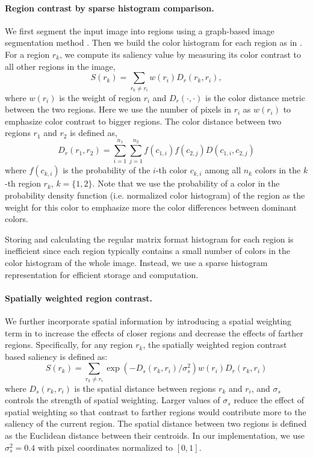 \documentclass[final]{cvpr}
\newcommand{\vnudge}{\vspace*{-.1in}}
\newcommand{\mypara}[1]{\paragraph{#1.}}
\begin{document}
\vnudge
\mypara{Region contrast by sparse histogram comparison}
We first segment the input image into regions using a graph-based image segmentation
method \cite{04ijcv/felzenszwalb_efficient}.
%
Then we build the color histogram for each region as in .
%
For a region $r_k$, we compute its saliency value by measuring its color contrast to all other
regions in the image,
\begin{equation}\label{equ:regContrastSaliency}
    S(r_k) = \sum_{r_k \neq r_i} w(r_i)  D_r(r_k, r_i),
\end{equation}
where $w(r_i)$ is the weight of region $r_i$ and $D_r(\cdot, \cdot)$ is the color distance metric
between the two regions.
%
Here we use the number of pixels in $r_i$ as $w(r_i)$ to emphasize color contrast to bigger regions.
%
The color distance between two regions $r_1$ and $r_2$ is defined as,
\begin{equation}\label{equ:regContrast}
    D_r(r_1, r_2) = \sum_{i=1}^{n_1} \sum_{j=1}^{n_2} f(c_{1,i}) f(c_{2,j}) D(c_{1,i}, c_{2,j})
\end{equation}
where $f(c_{k,i})$ is the probability of the $i$-th color $c_{k,i}$ among all $n_k$ colors in the
$k$-th
 region $r_k$, $k=\{1,2\}$.
%
%
Note that we use the probability of a color in the probability density function (i.e. normalized color histogram) of the region as the weight for this color to emphasize more the color differences between dominant colors.


Storing and calculating the regular matrix format histogram for each region is inefficient since
each region typically contains a small number of colors in the color histogram of the whole image.
%
Instead, we use a sparse histogram representation for efficient storage and computation.


\vnudge
\mypara{Spatially weighted region contrast} We further incorporate spatial information by
introducing a spatial weighting term in    to increase the effects
of closer regions and decrease the effects of farther regions.
%
Specifically, for any region $r_k$, the spatially weighted region contrast based saliency is
defined as:
\begin{equation}\label{equ:regContrastSpatial}
    S(r_k) =  \sum_{r_k \neq r_i} \exp({-D_s(r_k, r_i)/\sigma_s^2})  w(r_i)  D_r(r_k, r_i)
\end{equation}
where $D_s(r_k, r_i)$ is the spatial distance between regions $r_k$ and $r_i$, and $\sigma_s$
controls the strength of spatial weighting.
%
Larger values of $\sigma_s$ reduce the effect of spatial weighting
so that contrast to farther regions would contribute more to the saliency of the current region.
%
The spatial distance between two regions is defined as the Euclidean distance between their
centroids. In our implementation, we use $\sigma_s^2 = 0.4$ with pixel
coordinates normalized to $[0, 1]$.
\end{document}
